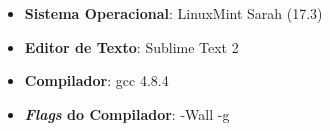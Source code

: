 \begin{itemize}
	\item{\textbf{Sistema Operacional}: LinuxMint Sarah (17.3)}
	\item{\textbf{Editor de Texto}: Sublime Text 2}
	\item{\textbf{Compilador}: gcc 4.8.4}
	\item{\textbf{\emph{Flags} do Compilador}: -Wall -g}
\end{itemize}
